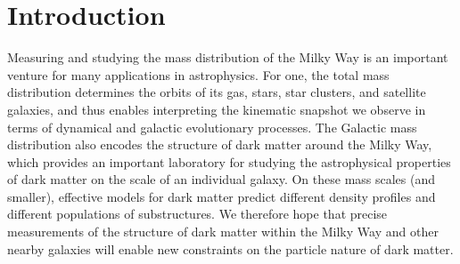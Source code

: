 \begin{abstract}

\end{abstract}


\section{Introduction} \label{sec:intro}

Measuring and studying the mass distribution of the Milky Way is an important venture
for many applications in astrophysics.
For one, the total mass distribution determines the orbits of its gas, stars, star
clusters, and satellite galaxies, and thus enables interpreting the kinematic snapshot
we observe in terms of dynamical and galactic evolutionary processes.
The Galactic mass distribution also encodes the structure of dark matter around the
Milky Way, which provides an important laboratory for studying the astrophysical
properties of dark matter on the scale of an individual galaxy.
On these mass scales (and smaller), effective models for dark matter predict different
density profiles and different populations of substructures.
We therefore hope that precise measurements of the structure of dark matter within the
Milky Way and other nearby galaxies will enable new constraints on the particle nature
of dark matter.

